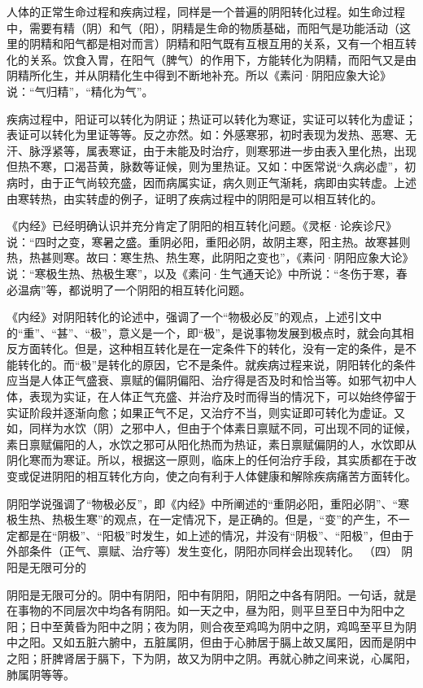 \documentclass[a4paper,12pt,UTF8,twoside]{ctexbook}
\begin{document}
人体的正常生命过程和疾病过程，同样是一个普遍的阴阳转化过程。如生命过程中，需要有精（阴）和气（阳），阴精是生命的物质基础，而阳气是功能活动（这里的阴精和阳气都是相对而言）阴精和阳气既有互根互用的关系，又有一个相互转化的关系。饮食入胃，在阳气（脾气）的作用下，方能转化为阴精，而阳气又是由阴精所化生，并从阴精化生中得到不断地补充。所以《素问·阴阳应象大论》说：“气归精”，“精化为气”。

疾病过程中，阳证可以转化为阴证；热证可以转化为寒证，实证可以转化为虚证；表证可以转化为里证等等。反之亦然。如：外感寒邪，初时表现为发热、恶寒、无汗、脉浮紧等，属表寒证，由于未能及时治疗，则寒邪进一步由表入里化热，出现但热不寒，口渴苔黄，脉数等证候，则为里热证。又如：中医常说“久病必虚”，初病时，由于正气尚较充盛，因而病属实证，病久则正气渐耗，病即由实转虚。上述由寒转热，由实转虚的例子，证明了疾病过程中的阴阳是可以相互转化的。

《内经》已经明确认识并充分肯定了阴阳的相互转化问题。《灵枢·论疾诊尺》说：“四时之变，寒暑之盛。重阴必阳，重阳必阴，故阴主寒，阳主热。故寒甚则热，热甚则寒。故曰：寒生热、热生寒，此阴阳之变也”，《素问·阴阳应象大论》说：“寒极生热、热极生寒”，以及《素问·生气通天论》中所说：“冬伤于寒，春必温病”等，都说明了一个阴阳的相互转化问题。

《内经》对阴阳转化的论述中，强调了一个“物极必反”的观点，上述引文中的“重”、“甚”、“极”，意义是一个，即“极”，是说事物发展到极点时，就会向其相反方面转化。但是，这种相互转化是在一定条件下的转化，没有一定的条件，是不能转化的。而“极”是转化的原因，它不是条件。就疾病过程来说，阴阳转化的条件应当是人体正气盛衰、禀赋的偏阴偏阳、治疗得是否及时和恰当等。如邪气初中人体，表现为实证，在人体正气充盛、并治疗及时而得当的情况下，可以始终停留于实证阶段并逐渐向愈；如果正气不足，又治疗不当，则实证即可转化为虚证。又如，同样为水饮（阴）之邪中人，但由于个体素日禀赋不同，可出现不同的证候，素日禀赋偏阳的人，水饮之邪可从阳化热而为热证，素日禀赋偏阴的人，水饮即从阴化寒而为寒证。所以，根据这一原则，临床上的任何治疗手段，其实质都在于改变或促进阴阳的相互转化方向，使之向有利于人体健康和解除疾病痛苦方面转化。

阴阳学说强调了“物极必反”，即《内经》中所阐述的“重阴必阳，重阳必阴”、“寒极生热、热极生寒”的观点，在一定情况下，是正确的。但是，“变”的产生，不一定都是在“阴极”、“阳极”时发生，如上述的情况，并没有“阴极”、“阳极”，但由于外部条件（正气、禀赋、治疗等）发生变化，阴阳亦同样会出现转化。
（四） 阴阳是无限可分的

阴阳是无限可分的。阴中有阴阳，阳中有阴阳，阴阳之中各有阴阳。一句话，就是在事物的不同层次中均各有阴阳。如一天之中，昼为阳，则平旦至日中为阳中之阳；日中至黄昏为阳中之阴；夜为阴，则合夜至鸡鸣为阴中之阴，鸡鸣至平旦为阴中之阳。又如五脏六腑中，五脏属阴，但由于心肺居于膈上故又属阳，因而是阴中之阳；肝脾肾居于膈下，下为阴，故又为阴中之阴。再就心肺之间来说，心属阳，肺属阴等等。
\end{document}
